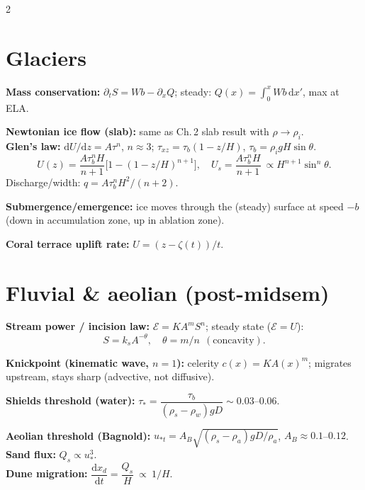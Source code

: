 \documentclass[9pt,a4paper]{extarticle}
\newcommand{\dd}{\mathrm{d}}
\newcommand{\dv}[2]{\dfrac{\dd #1}{\dd #2}}
\begin{document}
\begin{multicols}{2}
\section{Glaciers}
\begin{eqbox}
\textbf{Mass conservation:} $\partial_tS=Wb-\partial_xQ$; steady: $Q(x)=\int_0^xWb\,\dd x'$, max at ELA.
\end{eqbox}
\begin{eqbox}
\textbf{Newtonian ice flow (slab):} same as Ch.\,2 slab result with $\rho\to\rho_i$.\\
\textbf{Glen's law:} $\dd U/\dd z=A\tau^n$, $n\approx3$; $\tau_{xz}=\tau_b(1-z/H)$, $\tau_b=\rho_igH\sin\theta$.
\[
U(z)=\frac{A\tau_b^nH}{n+1}\Big[1-(1-z/H)^{n+1}\Big],\quad U_s=\frac{A\tau_b^nH}{n+1}\ \propto H^{n+1}\sin^n\theta.
\]
Discharge/width: $q=A\tau_b^nH^2/(n+2)$.
\end{eqbox}
\begin{eqbox}
\textbf{Submergence/emergence:} ice moves through the (steady) surface at speed $-b$ (down in accumulation zone, up in ablation zone).
\end{eqbox}
\begin{eqbox}
\textbf{Coral terrace uplift rate:} $U=(z-\zeta(t))/t$.
\end{eqbox}

\section{Fluvial \& aeolian (post-midsem)}
\begin{eqbox}
\textbf{Stream power / incision law:} $\mathcal E=KA^mS^n$; steady state ($\mathcal E=U$):
\[
S=k_sA^{-\theta},\quad \theta=m/n\ \ (\text{concavity}).
\]
\end{eqbox}
\begin{eqbox}
\textbf{Knickpoint (kinematic wave, $n=1$):} celerity $c(x)=KA(x)^m$; migrates upstream, stays sharp (advective, not diffusive).
\end{eqbox}
\begin{eqbox}
\textbf{Shields threshold (water):} $\tau_*=\dfrac{\tau_b}{(\rho_s-\rho_w)gD}\sim0.03\text{--}0.06$.
\end{eqbox}
\begin{eqbox}
\textbf{Aeolian threshold (Bagnold):} $u_{*t}=A_B\sqrt{(\rho_s-\rho_a)gD/\rho_a}$, $A_B\approx0.1$--$0.12$.\\
\textbf{Sand flux:} $Q_s\propto u_*^3$.\\
\textbf{Dune migration:} $\dv{x_d}{t}=\dfrac{Q_s}{H}\ \propto\ 1/H$.
\end{eqbox}


\end{multicols}
\end{document}
